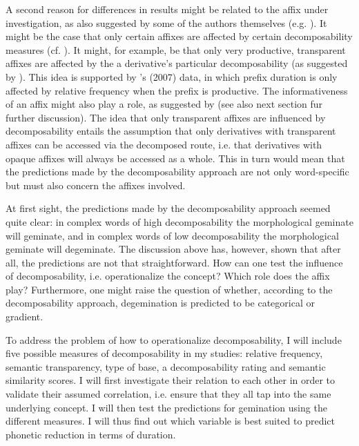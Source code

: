 {%
A second reason for differences in results might be related to the affix under investigation, as also suggested by some of the authors themselves (e.g. \citealt{Hanique.2011,Schuppler.2012}). It might be the case that only certain affixes are affected by certain decomposability measures (cf. \citealt{Collie.2008,Hanique.2011,Schuppler.2012}). It might, for example, be that only very productive, transparent affixes are affected by the a derivative's particular decomposability (as suggested by \citealt{Hanique.2011}). This idea is supported by \citeauthor{Hay.2007}'s (2007) data, in which prefix duration is only affected by relative frequency when the prefix is productive. The informativeness of an affix might also play a role, as suggested by \cite{Schuppler.2012} (see also next section fur further discussion). 
The idea that only transparent affixes are influenced by decomposability entails the assumption that only derivatives with transparent affixes can be accessed via the decomposed route,  i.e. that derivatives with opaque affixes will always be accessed as a whole. This in turn would mean that the predictions made by the decomposability approach are not only word-specific but must also concern the affixes involved.



At first sight, the predictions made by the decomposability approach seemed quite clear: in complex words of high decomposability the morphological geminate will geminate, and in complex words of low decomposability the morphological geminate will degeminate. The discussion above has, however, shown that after all, the predictions are not that straightforward.
 How can one test the influence of decomposability, i.e. operationalize the concept? Which role does the affix play? Furthermore, one might raise the question of whether, according to the decomposability approach, degemination is predicted to be categorical or gradient. 

\clearpage


 To address the problem of how to operationalize decomposability, I will include five possible measures of decomposability in my studies: relative frequency, semantic transparency, type of base, a decomposability rating and semantic similarity scores. I will first investigate their relation to each other in order to validate their assumed correlation, i.e. ensure that they all tap into the same underlying concept. I will then test the predictions for gemination using the different measures. I will thus find out which variable is best suited to predict phonetic reduction in terms of duration.



}
